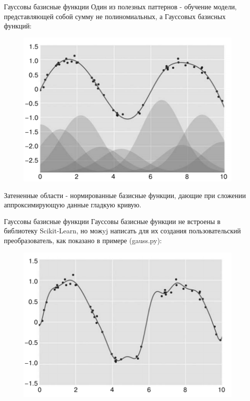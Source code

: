 \documentclass{beamer}
\begin{document}
\begin{frame}[fragile]{Гауссовы базисные функции}
Один из полезных паттернов - обучение модели, представляющей собой сумму не полиномиальных, а Гауссовых базисных функций:
\begin{figure}[h]
\centering
\includegraphics[scale=0.65]{images/gauss-01.png}
\end{figure}
Затененные области - нормированные базисные функции, дающие при сложении аппроксимирующую данные гладкую кривую.
\end{frame}

\begin{frame}[fragile]{Гауссовы базисные функции}
Гауссовы базисные функции не встроены в библиотеку Scikit-Learn, но можyj написать для их создания пользовательский преобразователь, как показано в примере (gauss.py):
\begin{figure}[h]
\centering
\includegraphics[scale=0.65]{images/gauss-02.png}
\end{figure}
\end{frame}
\end{document}

